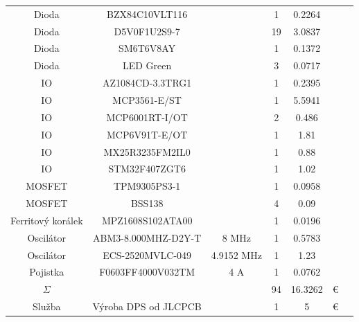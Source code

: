 \begin{table}[H]
\begin{ctucolortab}
\begin{tabular}{ccccccc}
            Dioda                 & BZX84C10VLT116         &               & 1     & 0.2264   &          & \\
            Dioda                 & D5V0F1U2S9-7           &               & 19    & 3.0837   &          & \\
            Dioda                 & SM6T6V8AY              &               & 1     & 0.1372   &          & \\
            Dioda                 & LED Green              &               & 3     & 0.0717   &          & \\
            IO                    & AZ1084CD-3.3TRG1       &               & 1     & 0.2395   &          & \\
            IO                    & MCP3561-E/ST           &               & 1     & 5.5941   &          & \\
            IO                    & MCP6001RT-I/OT         &               & 2     & 0.486    &          & \\
            IO                    & MCP6V91T-E/OT          &               & 1     & 1.81     &          & \\
            IO                    & MX25R3235FM2IL0        &               & 1     & 0.88     &          & \\
            IO                    & STM32F407ZGT6          &               & 1     & 1.02     &          & \\
            MOSFET                & TPM9305PS3-1           &               & 1     & 0.0958   &          & \\
            MOSFET                & BSS138                 &               & 4     & 0.09     &          & \\
            Ferritový korálek     & MPZ1608S102ATA00       &               & 1     & 0.0196   &          & \\
            Oscilátor             & ABM3-8.000MHZ-D2Y-T    & 8 MHz         & 1     & 0.5783   &          & \\
            Oscilátor             & ECS-2520MVLC-049       & 4.9152 MHz    & 1     & 1.23     &          & \\
            Pojistka              & F0603FF4000V032TM      & 4 A           & 1     & 0.0762   &          & \\
            \bottomrule
            $\Sigma$              &                        &               & 94    & 16.3262  & €        & \\
            \bottomrule
            Služba                & Výroba DPS od JLCPCB   &               & 1     & 5        & €        & \\

\end{tabular}
\end{ctucolortab}
\end{table}
